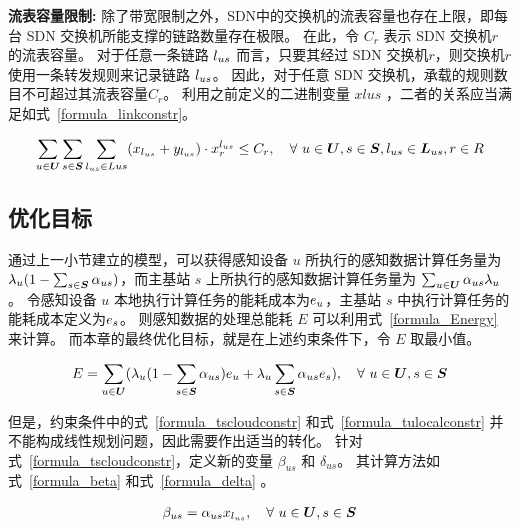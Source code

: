 \textbf{流表容量限制:}
除了带宽限制之外，SDN中的交换机的流表容量也存在上限，即每台 SDN 交换机所能支撑的链路数量存在极限。
在此，令 $C_r$ 表示 SDN 交换机$r$的流表容量。
对于任意一条链路 $l_{us}$ 而言，只要其经过 SDN 交换机$r$，则交换机$r$使用一条转发规则来记录链路 $l_{us}$。
因此，对于任意 SDN 交换机，承载的规则数目不可超过其流表容量$C_r$。
利用之前定义的二进制变量 $xlus$ ，二者的关系应当满足如式~\eqref{formula_linkconstr}。

\begin{equation}
\label{formula_linkconstr}
\begin{gathered}
\sum\limits_{u \in \boldsymbol{U}}\sum\limits_{s \in \boldsymbol{S}}\sum\limits_{l_{us} \in Lus}(x_{l_{us}} + y_{l_{us}}) \cdot x^{l_{us}}_{r} \leq C_r,
\quad  \forall\ u \in \boldsymbol{U}, s \in \boldsymbol{S}, l_{us} \in \boldsymbol{L}_{us}, r\in R\\
\end{gathered}
\end{equation}

\subsection{优化目标}

通过上一小节建立的模型，可以获得感知设备 $u$ 所执行的感知数据计算任务量为 ${\lambda}_{u}(1-\sum_{s\in \boldsymbol{S}}{\alpha}_{us})$，而主基站 $s$ 上所执行的感知数据计算任务量为 $\sum_{u\in \boldsymbol{U}}{\alpha}_{us}{\lambda}_{u}$。
令感知设备 $u$ 本地执行计算任务的能耗成本为$e_u$，主基站 $s$ 中执行计算任务的能耗成本定义为$e_s$。
则感知数据的处理总能耗 $E$ 可以利用式~\ref{formula_Energy} 来计算。
而本章的最终优化目标，就是在上述约束条件下，令 $E$ 取最小值。

\begin{equation}
\label{formula_Energy}
  \begin{gathered}
    E = \sum\limits_{u\in \boldsymbol{U}}({\lambda}_{u}(1-\sum\limits_{s\in \boldsymbol{S}}{\alpha}_{us})e_u + {\lambda}_{u}\sum\limits_{s\in \boldsymbol{S}}{\alpha}_{us}e_s),
    \quad \forall\ u \in \boldsymbol{U}, s \in \boldsymbol{S}
  \end{gathered}
\end{equation}

但是，约束条件中的式~\eqref{formula_tscloudconstr} 和式~\eqref{formula_tulocalconstr} 并不能构成线性规划问题，因此需要作出适当的转化。
针对式~\eqref{formula_tscloudconstr}，定义新的变量 $\beta_{us}$ 和 $\delta_{us}$。
其计算方法如式~\eqref{formula_beta} 和式~\eqref{formula_delta} 。

\begin{equation}
  \label{formula_beta}
  \begin{gathered}
    \beta_{us} = {\alpha}_{us} x_{l_{us}},
    \quad \forall\ u \in \boldsymbol{U}, s \in \boldsymbol{S}
  \end{gathered}
\end{equation}


